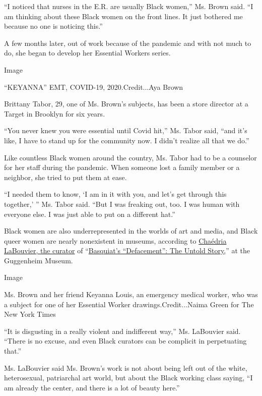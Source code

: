 ``I noticed that nurses in the E.R. are usually Black women,'' Ms. Brown
said. ``I am thinking about these Black women on the front lines. It
just bothered me because no one is noticing this.''

A few months later, out of work because of the pandemic and with not
much to do, she began to develop her Essential Workers series.

Image

``KEYANNA'' EMT, COVID-19, 2020.Credit...Aya Brown

Brittany Tabor, 29, one of Ms. Brown's subjects, has been a store
director at a Target in Brooklyn for six years.

``You never knew you were essential until Covid hit,'' Ms. Tabor said,
``and it's like, I have to stand up for the community now. I didn't
realize all that we do.''

Like countless Black women around the country, Ms. Tabor had to be a
counselor for her staff during the pandemic. When someone lost a family
member or a neighbor, she tried to put them at ease.

``I needed them to know, `I am in it with you, and let's get through
this together,' '' Ms. Tabor said. ``But I was freaking out, too. I was
human with everyone else. I was just able to put on a different hat.''

Black women are also underrepresented in the worlds of art and media,
and Black queer women are nearly nonexistent in museums, according to
\href{https://www.nytimes.com/2019/07/30/arts/design/basquiat-defacement-guggenheim-curator.html}{Chaédria
LaBouvier, the curator} of
``\href{https://www.guggenheim.org/exhibition/basquiats-defacement-the-untold-story}{Basquiat's
``Defacement'': The Untold Story,}'' at the Guggenheim Museum.

Image

Ms. Brown and her friend Keyanna Louis, an emergency medical worker, who
was a subject for one of her Essential Worker drawings.Credit...Naima
Green for The New York Times

``It is disgusting in a really violent and indifferent way,'' Ms.
LaBouvier said. ``There is no excuse, and even Black curators can be
complicit in perpetuating that.''

Ms. LaBouvier said Ms. Brown's work is not about being left out of the
white, heterosexual, patriarchal art world, but about the Black working
class saying, ``I am already the center, and there is a lot of beauty
here.''

